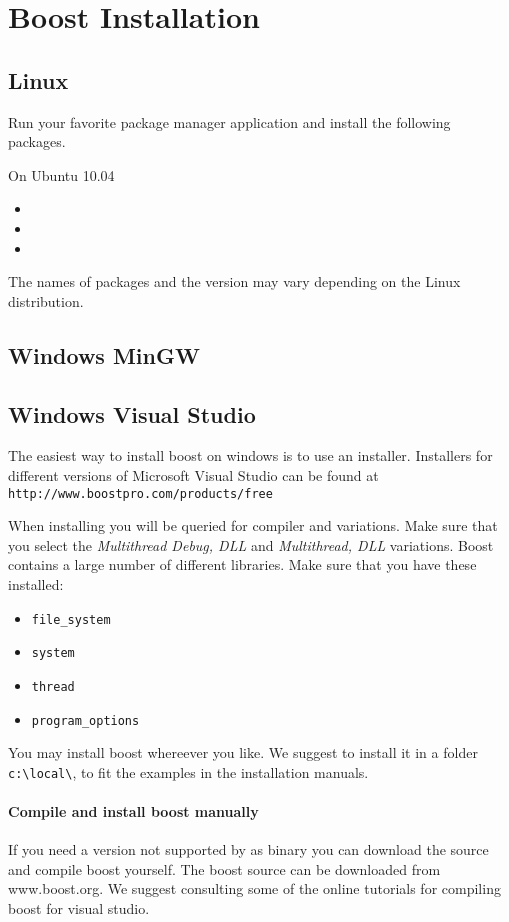 \section{Boost Installation}

\subsection{Linux}
Run your favorite package manager application and install the following packages.

On Ubuntu 10.04
\begin{itemize}
\item
\item 
\item
\end{itemize}

The names of packages and the version may vary depending on the Linux distribution.


\subsection{Windows MinGW}

\subsection{Windows Visual Studio}
The easiest way to install boost on windows is to use an installer. Installers for different versions of Microsoft Visual Studio can be found at
\lstinline{http://www.boostpro.com/products/free}

When installing you will be queried for compiler and variations. Make sure that you select the \emph{Multithread Debug, DLL} and \emph{Multithread, DLL} variations. Boost contains a large number of different libraries. Make sure that you have these installed:
\begin{itemize}
\item \lstinline{file_system}
\item \lstinline{system}
\item \lstinline{thread}
\item \lstinline{program_options}
\end{itemize}

You may install boost whereever you like. We suggest to install it in a folder \lstinline{c:\local\}, to fit the examples in the installation manuals.

\paragraph{Compile and install boost manually}
If you need a version not supported by as binary you can download the source and compile boost yourself. The boost source can be downloaded from www.boost.org. We suggest consulting some of the online tutorials for compiling boost for visual studio. 
